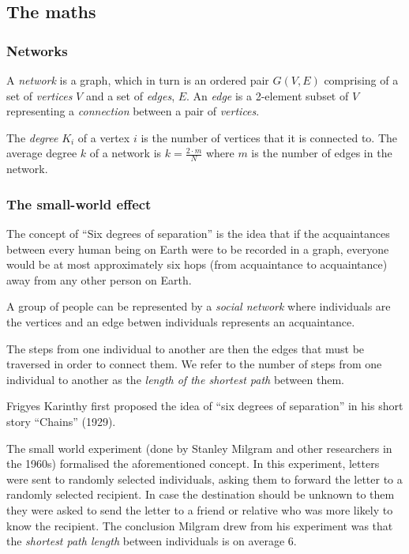 \documentclass[a4paper,11pt,titlepage]{article}
\begin{document}
\subsection{The maths}


\subsubsection{Networks}

A \emph{network} is a graph, which in turn is an ordered pair $G(V,E)$
comprising of a set of \emph{vertices} $V$ and a set of \emph{edges}, $E$.
An \emph{edge} is a 2-element subset of $V$ representing a
\emph{connection} between a pair of \emph{vertices}.

The \emph{degree} $K_i$ of a vertex $i$ is the number of vertices that it is
connected to. The average degree $k$ of a network is $k =\frac{2 \cdot m}{N}$
where $m$ is the number of edges in the network.

\subsubsection{The small-world effect}

The concept of ``Six degrees of separation'' is the idea that if the
acquaintances between every human being on Earth were to be recorded
in a graph, everyone would be at most approximately six hops (from
acquaintance to acquaintance) away from any other person on Earth.

A group of people can be represented by a \emph{social network} where
individuals are the vertices and an edge betwen individuals represents
an acquaintance.

The steps from one individual to another are then the edges that must be
traversed in order to connect them. We refer to the number of steps from
one individual to another as the \emph{length of the shortest path} between
them.

Frigyes Karinthy first proposed the idea of ``six degrees of separation''
in his short story ``Chains'' (1929).

The small world experiment (done by Stanley Milgram and other researchers in the
1960s) formalised the aforementioned concept. In this experiment, letters were
sent to randomly selected individuals, asking them to forward the letter to a
randomly selected recipient. In case the destination should be unknown to them
they were asked to send the letter to a friend or
relative who was more likely to know the recipient.
The conclusion Milgram drew from his experiment was that the
\emph{shortest path length} between individuals is on average $6$.
\end{document}
